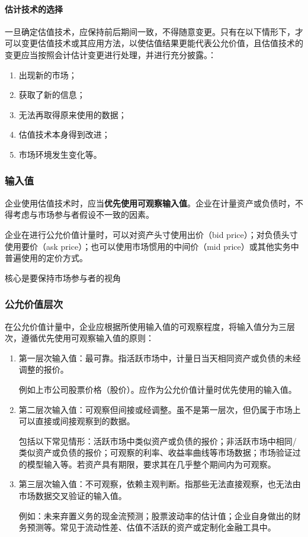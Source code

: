 \documentclass[UTF8,12pt]{ctexart}
\numberwithin{equation}{section} %
\numberwithin{figure}{section}
\numberwithin{table}{section}
\begin{document}
	\paragraph{估计技术的选择}	
	一旦确定估值技术，应保持前后期间一致，不得随意变更。只有在以下情形下，才可以变更估值技术或其应用方法，以使估值结果更能代表公允价值，且估值技术的变更应当按照会计估计变更进行处理，并进行充分披露。：
	\begin{enumerate}
		\item 出现新的市场；
		
		\item 获取了新的信息；
		
		\item 无法再取得原来使用的数据；
		
		\item 估值技术本身得到改进；
		
		\item 市场环境发生变化等。
	\end{enumerate}
	

	
	\subsubsection{输入值}
	企业使用估值技术时，应当\textbf{优先使用可观察输入值}。企业在计量资产或负债时，不得考虑与市场参与者假设不一致的因素。
	
	企业在进行公允价值计量时，可以对资产头寸使用出价（bid price）；对负债头寸使用要价（ask price）；也可以使用市场惯用的中间价（mid price）或其他实务中普遍使用的定价方式。	
	
	核心是要保持市场参与者的视角
	
	\subsubsection{公允价值层次}
	在公允价值计量中，企业应根据所使用输入值的可观察程度，将输入值分为三层次，遵循优先使用可观察输入值的原则：
	\begin{enumerate}
		\item 第一层次输入值：最可靠。指活跃市场中，计量日当天相同资产或负债的未经调整的报价。
		
		例如上市公司股票价格（股价）。应作为公允价值计量时优先使用的输入值。
		
		\item 第二层次输入值：可观察但间接或经调整。虽不是第一层次，但仍属于市场上可以直接或间接观察到的数据。
		
		包括以下常见情形：活跃市场中类似资产或负债的报价；非活跃市场中相同/类似资产或负债的报价；可观察的利率、收益率曲线等市场数据；市场验证过的模型输入等。若资产具有期限，要求其在几乎整个期间内为可观察。
		
		\item 第三层次输入值：不可观察，依赖主观判断。指那些无法直接观察，也无法由市场数据交叉验证的输入值。
		
		例如：未来弃置义务的现金流预测；股票波动率的估计值；企业自身做出的财务预测等。常见于流动性差、估值不活跃的资产或定制化金融工具中。
	\end{enumerate}
	
\end{document}

